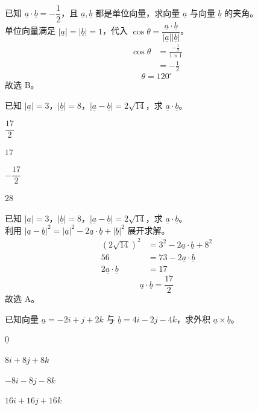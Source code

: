\documentclass[12pt,a4paper]{exam-zh}
\begin{document}
\begin{solution}
    已知 $\underline{a}\cdot\underline{b}=-\dfrac12$，且 $\underline{a},\underline{b}$ 都是单位向量，求向量 $\underline{a}$ 与向量 $\underline{b}$ 的夹角。 \\
    单位向量满足 $|\underline{a}|=|\underline{b}|=1$，代入 $\cos\theta=\dfrac{\underline{a}\cdot\underline{b}}{|\underline{a}||\underline{b}|}$。 \\
    \begin{align*}
        \cos\theta &= \frac{-\frac12}{1\times1} \\
        &= -\frac12
    \end{align*}
    \[
        \theta = 120^\circ
    \]
    故选 B。
\end{solution}
\begin{question}
    已知 $|\underline a|=3$，$|\underline b|=8$，$|\underline a-\underline b|=2\sqrt{14}$，求 $\underline a\cdot\underline b$。 \paren[2]
    \begin{choices}
        \item $\dfrac{17}{2}$
        \item $17$
        \item $-\dfrac{17}{2}$
        \item $28$
    \end{choices}
\end{question}

\begin{solution}
    已知 $|\underline a|=3$，$|\underline b|=8$，$|\underline a-\underline b|=2\sqrt{14}$，求 $\underline a\cdot\underline b$。 \\
    利用 $|\underline a-\underline b|^2=|\underline a|^2-2\underline a\cdot\underline b+|\underline b|^2$ 展开求解。 \\
    \begin{align*}
        (2\sqrt{14})^2 &= 3^2-2\underline a\cdot\underline b+8^2 \\
        56 &= 73-2\underline a\cdot\underline b \\
        2\underline a\cdot\underline b &= 17
    \end{align*}
    \[
        \underline a\cdot\underline b = \frac{17}{2}
    \]
    故选 A。
\end{solution}

\begin{question}
    已知向量 $\underline a=-2i+j+2k$ 与 $\underline b=4i-2j-4k$，求外积 $\underline a\times\underline b$。 \paren[2]
    \begin{choices}
        \item $\underline 0$
        \item $8i+8j+8k$
        \item $-8i-8j-8k$
        \item $16i+16j+16k$
    \end{choices}
\end{question}
\end{document}
